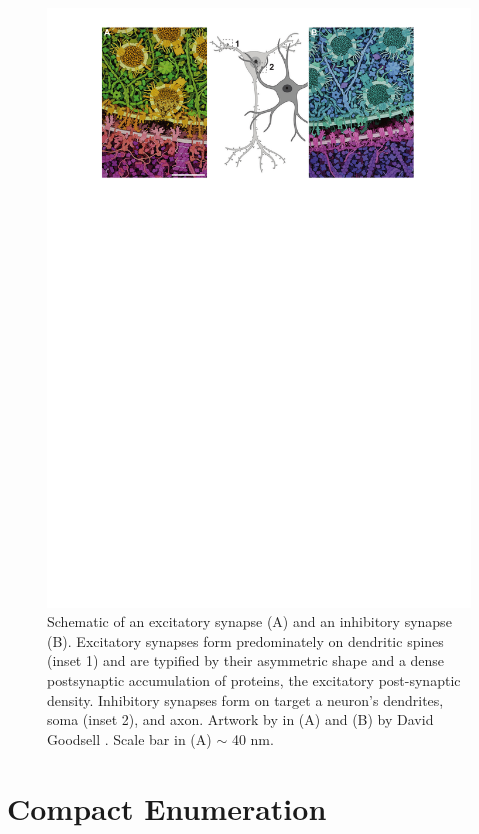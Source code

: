 \documentclass[PhD]{dukethesis}
\begin{document}
\begin{figure}[ht]
	\begin{center}
		\includegraphics[width=0.7\paperwidth,keepaspectratio]{goodsell}
		\caption[The Central Synapse]{Schematic of an excitatory synapse
			(A) and an inhibitory synapse (B). Excitatory synapses form
			predominately on dendritic spines (inset 1) and are typified by
			their asymmetric shape and a dense postsynaptic accumulation of
			proteins, the excitatory post-synaptic density.  Inhibitory synapses
			form on target a neuron's dendrites, soma (inset 2), and axon.
			Artwork by in (A) and (B) by David Goodsell \cite{Goodsell2020}.
			Scale bar in (A) $\sim$ 40 nm.}
		\label{fig:goodsell}
	\end{center}
\end{figure}


\section{Compact Enumeration}
\end{document}

